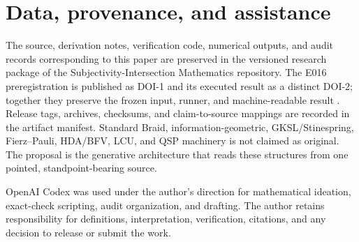 \documentclass[11pt]{article}
\theoremstyle{definition}
\theoremstyle{remark}
\begin{document}
\section{Data, provenance, and assistance}

The source, derivation notes, verification code, numerical outputs, and audit records corresponding to this paper are preserved in the versioned research package of the Subjectivity-Intersection Mathematics repository. The E016 preregistration is published as DOI-1 and its executed result as a distinct DOI-2; together they preserve the frozen input, runner, and machine-readable result \cite{e016prereg,e016result}. Release tags, archives, checksums, and claim-to-source mappings are recorded in the artifact manifest. Standard Braid, information-geometric, GKSL/Stinespring, Fierz--Pauli, HDA/BFV, LCU, and QSP machinery is not claimed as original. The proposal is the generative architecture that reads these structures from one pointed, standpoint-bearing source.

OpenAI Codex was used under the author's direction for mathematical ideation, exact-check scripting, audit organization, and drafting. The author retains responsibility for definitions, interpretation, verification, citations, and any decision to release or submit the work.
\end{document}
